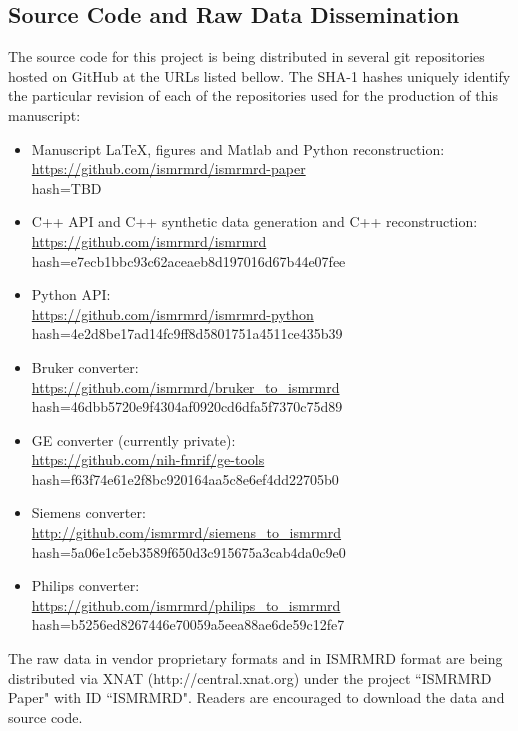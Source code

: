 \documentclass[12pt]{article}
\begin{document}
\subsection*{Source Code and Raw Data Dissemination}
The source code for this project is being distributed in several git repositories hosted on GitHub at the URLs listed bellow.  The SHA-1 hashes uniquely identify the particular revision of each of the repositories used for the production of this manuscript:
\begin{itemize}
\item Manuscript LaTeX, figures and Matlab and Python reconstruction: \\
	\url{https://github.com/ismrmrd/ismrmrd-paper} \\
	hash=TBD
\item C++ API and C++ synthetic data generation and C++ reconstruction: \\
	\url{https://github.com/ismrmrd/ismrmrd} \\
    	hash=e7ecb1bbc93c62aceaeb8d197016d67b44e07fee
\item Python API: \\
	\url{https://github.com/ismrmrd/ismrmrd-python} \\
	hash=4e2d8be17ad14fc9ff8d5801751a4511ce435b39
\item Bruker converter: \\
	\url{https://github.com/ismrmrd/bruker_to_ismrmrd}\\
	hash=46dbb5720e9f4304af0920cd6dfa5f7370c75d89
\item GE converter (currently private):\\
	 \url{https://github.com/nih-fmrif/ge-tools} \\
	 hash=f63f74e61e2f8bc920164aa5c8e6ef4dd22705b0
\item Siemens converter:\\
	 \url{http://github.com/ismrmrd/siemens_to_ismrmrd}\\
	 hash=5a06e1c5eb3589f650d3c915675a3cab4da0c9e0
\item Philips converter: \\
	\url{https://github.com/ismrmrd/philips_to_ismrmrd}\\
	hash=b5256ed8267446e70059a5eea88ae6de59c12fe7
\end{itemize}
The raw data in vendor proprietary formats and in ISMRMRD format are being distributed via XNAT (http://central.xnat.org) under the project ``ISMRMRD Paper" with ID ``ISMRMRD".  Readers are encouraged to download the data and source code.
\end{document}
